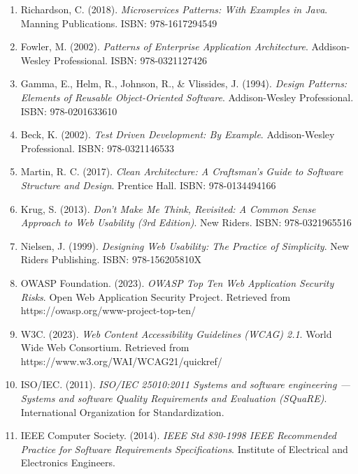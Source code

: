 \begin{enumerate}
\item Richardson, C. (2018). \textit{Microservices Patterns: With Examples in Java}. Manning Publications. ISBN: 978-1617294549

\item Fowler, M. (2002). \textit{Patterns of Enterprise Application Architecture}. Addison-Wesley Professional. ISBN: 978-0321127426

\item Gamma, E., Helm, R., Johnson, R., \& Vlissides, J. (1994). \textit{Design Patterns: Elements of Reusable Object-Oriented Software}. Addison-Wesley Professional. ISBN: 978-0201633610

\item Beck, K. (2002). \textit{Test Driven Development: By Example}. Addison-Wesley Professional. ISBN: 978-0321146533

\item Martin, R. C. (2017). \textit{Clean Architecture: A Craftsman's Guide to Software Structure and Design}. Prentice Hall. ISBN: 978-0134494166

\item Krug, S. (2013). \textit{Don't Make Me Think, Revisited: A Common Sense Approach to Web Usability (3rd Edition)}. New Riders. ISBN: 978-0321965516

\item Nielsen, J. (1999). \textit{Designing Web Usability: The Practice of Simplicity}. New Riders Publishing. ISBN: 978-156205810X

\item OWASP Foundation. (2023). \textit{OWASP Top Ten Web Application Security Risks}. Open Web Application Security Project. Retrieved from https://owasp.org/www-project-top-ten/

\item W3C. (2023). \textit{Web Content Accessibility Guidelines (WCAG) 2.1}. World Wide Web Consortium. Retrieved from https://www.w3.org/WAI/WCAG21/quickref/

\item ISO/IEC. (2011). \textit{ISO/IEC 25010:2011 Systems and software engineering — Systems and software Quality Requirements and Evaluation (SQuaRE)}. International Organization for Standardization.

\item IEEE Computer Society. (2014). \textit{IEEE Std 830-1998 IEEE Recommended Practice for Software Requirements Specifications}. Institute of Electrical and Electronics Engineers.


\end{enumerate}
